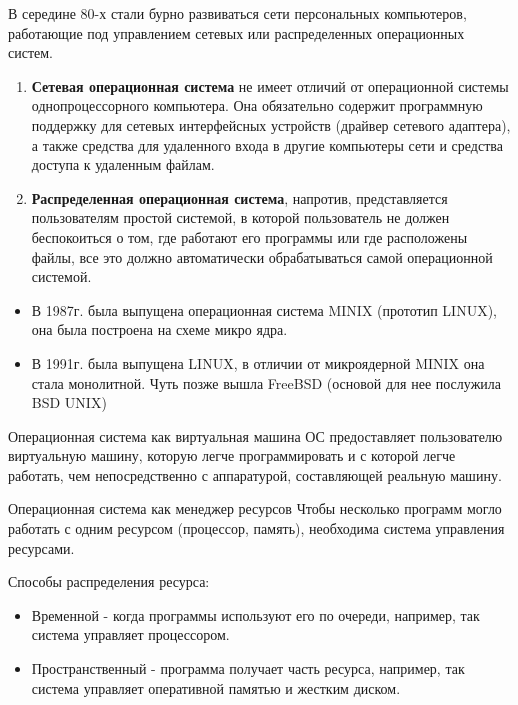 \documentclass{beamer}
\begin{document}
\begin{frame}[t]
В середине 80-х стали бурно развиваться сети персональных компьютеров, работающие под управлением сетевых или распределенных операционных систем.
\begin{enumerate}
\item \textbf{Сетевая операционная система} не имеет отличий от операционной системы однопроцессорного компьютера. Она обязательно содержит программную поддержку для сетевых интерфейсных устройств (драйвер сетевого адаптера), а также средства для удаленного входа в другие компьютеры сети и средства доступа к удаленным файлам.
\item \textbf{Распределенная операционная система}, напротив, представляется пользователям простой системой, в которой пользователь не должен беспокоиться о том, где работают его программы или где расположены файлы, все это должно автоматически обрабатываться самой операционной системой.
\end{enumerate}
\begin{itemize}
\item В 1987г. была выпущена операционная система MINIX (прототип LINUX), она была построена на схеме микро ядра.
\item В 1991г. была выпущена LINUX, в отличии от микроядерной MINIX она стала монолитной. Чуть позже вышла FreeBSD (основой для нее послужила BSD UNIX)
\end{itemize}
\end{frame} 

\begin{frame}[t]
\begin{block}{Операционная система как виртуальная машина}
ОС предоставляет пользователю виртуальную машину, которую легче программировать и с которой легче работать, чем непосредственно с аппаратурой, составляющей реальную машину. 
\end{block}
\end{frame}

\begin{frame}[t]
\begin{block}{Операционная система как менеджер ресурсов}
Чтобы несколько программ могло работать с одним ресурсом (процессор, память), необходима система управления ресурсами. 
\end{block}
Способы распределения ресурса:
\begin{itemize}
\item Временной - когда программы используют его по очереди, например, так система управляет процессором.
\item Пространственный - программа получает часть ресурса, например, так система управляет оперативной памятью и жестким диском.
\end{itemize}
\end{frame}
\end{document}
